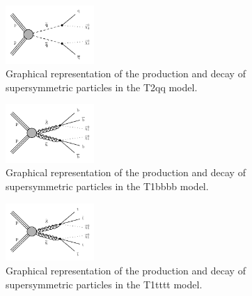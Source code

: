\begin{figure} \begin{center}
    \includegraphics[width=0.3\textwidth]{Supplementary/CMS-SUS-16-038_Figure-aux_002}
        \caption{
            Graphical representation of the production and decay of
            supersymmetric particles in the T2qq model.
        }
        \label{fig:simplified-models-feyn-T2qq}
\end{center} \end{figure}

\begin{figure}[h!] \begin{center}
    \includegraphics[width=0.3\textwidth]{Supplementary/CMS-SUS-16-038_Figure-aux_003}
        \caption{
            Graphical representation of the production and decay of
            supersymmetric particles in the T1bbbb model.
        }
        \label{fig:simplified-models-feyn-T1bbbb}
\end{center} \end{figure}

\begin{figure}[h!] \begin{center}
    \includegraphics[width=0.3\textwidth]{Supplementary/CMS-SUS-16-038_Figure-aux_004}
        \caption{
            Graphical representation of the production and decay of
            supersymmetric particles in the T1tttt model.
        }
        \label{fig:simplified-models-feyn-T1tttt}
\end{center} \end{figure}


